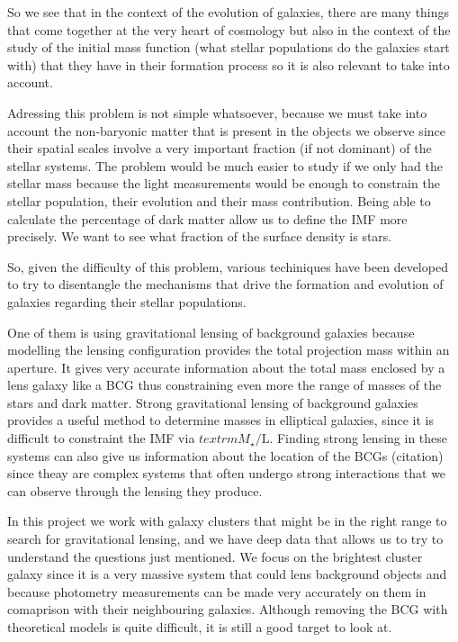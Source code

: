 So we see that in the context of the evolution of galaxies, there are many things that come together at the very heart of cosmology but also in the context of the study of the initial mass function (what stellar populations do the galaxies start with) that they have in their formation process so it is also relevant to take into account.

Adressing this problem is not simple whatsoever, because we must take into account the non-baryonic matter that is present in the objects we observe since their spatial scales involve a very important fraction (if not dominant) of the stellar systems. The problem would be much easier to study if we only had the stellar mass because the light measurements would be enough to constrain the stellar population, their evolution and their mass contribution. Being able to calculate the percentage of dark matter allow us to define the IMF more precisely. We want to see what fraction of the surface density is stars.

So, given the difficulty of this problem, various techiniques have been developed to try to disentangle the mechanisms that drive the formation and evolution of galaxies regarding their stellar populations. 

One of them is using gravitational lensing of background galaxies because modelling the lensing configuration provides the total projection mass within an aperture. It gives very accurate information about the total mass enclosed by a lens galaxy like a BCG thus constraining even more the range of masses of the stars and dark matter. Strong gravitational lensing of background galaxies provides a useful method to determine masses in elliptical galaxies, since it is difficult to constraint the IMF via $textrm{M}_{\star}/\text{L}$. Finding strong lensing in these systems can also give us information about the location of the BCGs (citation) since theay are complex systems that often undergo strong interactions that we can observe through the lensing they produce. 

In this project we work with galaxy clusters that might be in the right range to search for gravitational lensing, and we have deep data that allows us to try to understand the questions just mentioned. We focus on the brightest cluster galaxy since it is a very massive system that could lens background objects and because photometry measurements can be made very accurately on them in comaprison with their neighbouring galaxies. Although removing the BCG with theoretical models is quite difficult, it is still a good target to look at. 

